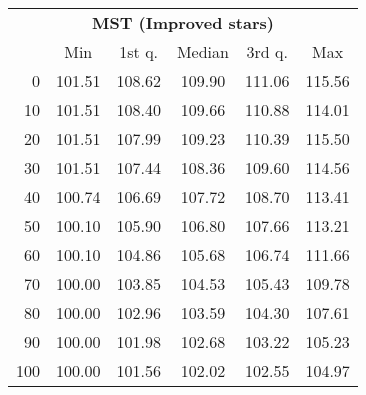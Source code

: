 \begin{tabular}{r|ccccc}
  \multicolumn{6}{c}{{\bf MST (Improved stars)}} \\
  & Min & 1st q. & Median & 3rd q. & Max \\ \hline\hline
  0 & 101.51 & 108.62 & 109.90 & 111.06 & 115.56
\\ 10 & 101.51 & 108.40 & 109.66 & 110.88 & 114.01
\\ 20 & 101.51 & 107.99 & 109.23 & 110.39 & 115.50
\\ 30 & 101.51 & 107.44 & 108.36 & 109.60 & 114.56
\\ 40 & 100.74 & 106.69 & 107.72 & 108.70 & 113.41
\\ 50 & 100.10 & 105.90 & 106.80 & 107.66 & 113.21
\\ 60 & 100.10 & 104.86 & 105.68 & 106.74 & 111.66
\\ 70 & 100.00 & 103.85 & 104.53 & 105.43 & 109.78
\\ 80 & 100.00 & 102.96 & 103.59 & 104.30 & 107.61
\\ 90 & 100.00 & 101.98 & 102.68 & 103.22 & 105.23
\\ 100 & 100.00 & 101.56 & 102.02 & 102.55 & 104.97
\end{tabular}
